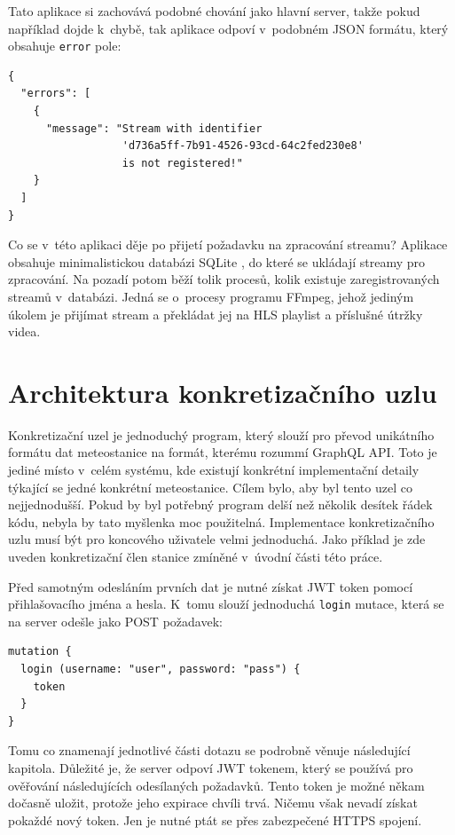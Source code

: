 Tato aplikace si zachovává podobné chování jako hlavní server, takže pokud například dojde k~chybě, tak aplikace odpoví v~podobném JSON formátu, který obsahuje \texttt{error} pole:

\begin{verbatim}
{
  "errors": [
    {
      "message": "Stream with identifier
                  'd736a5ff-7b91-4526-93cd-64c2fed230e8'
                  is not registered!"
    }
  ]
}
\end{verbatim}

Co se v~této aplikaci děje po přijetí požadavku na zpracování streamu? Aplikace obsahuje minimalistickou databázi SQLite \cite{sqlite}, do které se ukládají streamy pro zpracování. Na pozadí potom běží tolik procesů, kolik existuje zaregistrovaných streamů v~databázi. Jedná se o~procesy programu FFmpeg, jehož jediným úkolem je přijímat stream a překládat jej na HLS playlist a příslušné útržky videa.


\section{Architektura konkretizačního uzlu}
Konkretizační uzel je jednoduchý program, který slouží pro převod uni\-kát\-ní\-ho formátu dat meteostanice na formát, kterému rozummí GraphQL API. Toto je jediné místo v~celém systému, kde existují konkrétní implementační detaily týkající se jedné konkrétní meteostanice. Cílem bylo, aby byl tento uzel co nejjednodušší. Pokud by byl potřebný program delší než několik desítek řádek kódu, nebyla by tato myšlenka moc použitelná. Implementace konkretizačního uzlu musí být pro koncového uživatele velmi jednoduchá. Jako příklad je zde uveden konkretizační člen stanice zmíněné v~úvodní části této práce.

Před samotným odesláním prvních dat je nutné získat JWT token pomocí přihlašovacího jména a hesla. K~tomu slouží jednoduchá \texttt{login} mutace, která se na server odešle jako POST požadavek:

\begin{verbatim}
mutation {
  login (username: "user", password: "pass") {
    token
  }
}
\end{verbatim}

Tomu co znamenají jednotlivé části dotazu se podrobně věnuje následující kapitola. Důležité je, že server odpoví JWT tokenem, který se používá pro ověřování následujících odesílaných požadavků. Tento token je možné někam dočasně uložit, protože jeho expirace chvíli trvá. Ničemu však nevadí získat pokaždé nový token. Jen je nutné ptát se přes zabezpečené HTTPS spojení.

